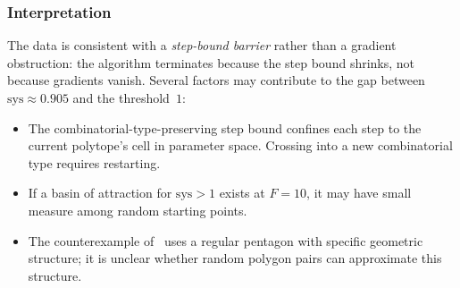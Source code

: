 \subsubsection*{Interpretation}
\begin{unverified}
The data is consistent with a \emph{step-bound barrier}
rather than a gradient obstruction:
the algorithm terminates because the step bound shrinks,
not because gradients vanish.
Several factors may contribute to the gap between
$\mathrm{sys} \approx 0.905$ and the threshold~$1$:
\begin{itemize}
\item The combinatorial-type-preserving step bound confines each step
  to the current polytope's cell in parameter space.
  Crossing into a new combinatorial type requires restarting.
\item If a basin of attraction for $\mathrm{sys} > 1$ exists at
  $F = 10$, it may have small measure among random starting points.
\item The counterexample of~\cite{HaimKislevOstrover2024} uses a regular
  pentagon with specific geometric structure; it is unclear whether
  random polygon pairs can approximate this structure.
\end{itemize}
\end{unverified}
